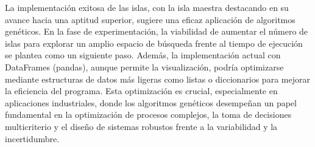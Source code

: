 La implementación exitosa de las islas, con la isla maestra destacando en su avance hacia una aptitud superior, sugiere una eficaz aplicación de algoritmos genéticos. En la fase de experimentación, la viabilidad de aumentar el número de islas para explorar un amplio espacio de búsqueda frente al tiempo de ejecución se plantea como un siguiente paso. Además, la implementación actual con DataFrames (pandas), aunque permite la visualización, podría optimizarse mediante estructuras de datos más ligeras como listas o diccionarios para mejorar la eficiencia del programa. Esta optimización es crucial, especialmente en aplicaciones industriales, donde los algoritmos genéticos desempeñan un papel fundamental en la optimización de procesos complejos, la toma de decisiones multicriterio y el diseño de sistemas robustos frente a la variabilidad y la incertidumbre.